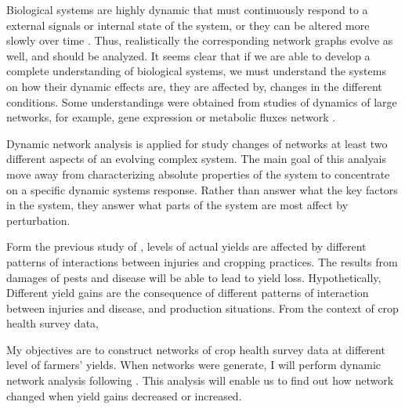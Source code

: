 Biological systems are highly dynamic that must continuously respond to a external signals or internal state of the system, or they can be altered more slowly over time . Thus, realistically the corresponding network graphs evolve as well, and should be analyzed. It seems clear that if we are able to develop a complete understanding of biological systems, we must understand the systems on how their dynamic effects are, they are affected by, changes in the different conditions. Some understandings were obtained from studies of dynamics of large networks, for example, gene expression or metabolic fluxes network .

Dynamic network analysis is applied for study changes of networks at least two different aspects of an evolving complex system. The main goal of this analyais move away from characterizing absolute properties of the system to concentrate on a specific dynamic systems response. Rather than answer what the key factors in the system, they answer what parts of the system are most affect by perturbation.

Form the previous study of , levels of actual yields are affected by different patterns of interactions between injuries and cropping practices. The results from damages of pests and disease will be able to lead to yield loss. Hypothetically, Different yield gains are the consequence of different patterns of interaction between injuries and disease, and production situations.  From the context of crop health survey data, 

My objectives are to construct networks of crop health survey data at different level of farmers' yields. When networks were generate, I will perform dynamic network analysis following . This analysis will enable us to find out how network changed when yield gains decreased or increased.

